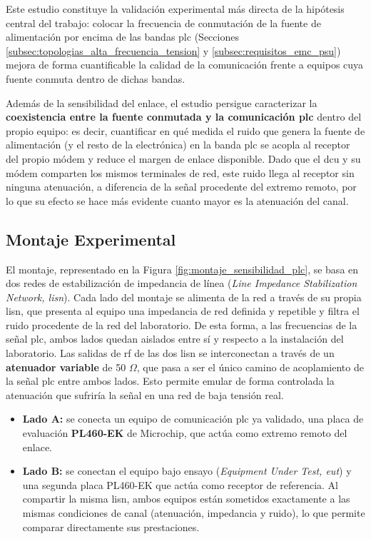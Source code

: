 Este estudio constituye la validación experimental más directa de la hipótesis central del trabajo: colocar la frecuencia de conmutación de la fuente de alimentación por encima de las bandas \gls{plc} (Secciones \ref{subsec:topologias_alta_frecuencia_tension} y \ref{subsec:requisitos_emc_psu}) mejora de forma cuantificable la calidad de la comunicación frente a equipos cuya fuente conmuta dentro de dichas bandas.

Además de la sensibilidad del enlace, el estudio persigue caracterizar la \textbf{coexistencia entre la fuente conmutada y la comunicación \gls{plc}} dentro del propio equipo: es decir, cuantificar en qué medida el ruido que genera la fuente de alimentación (y el resto de la electrónica) en la banda \gls{plc} se acopla al receptor del propio módem y reduce el margen de enlace disponible. Dado que el \gls{dcu} y su módem comparten los mismos terminales de red, este ruido llega al receptor sin ninguna atenuación, a diferencia de la señal procedente del extremo remoto, por lo que su efecto se hace más evidente cuanto mayor es la atenuación del canal.

\subsection{Montaje Experimental}
\label{subsec:montaje_sensibilidad}

El montaje, representado en la Figura \ref{fig:montaje_sensibilidad_plc}, se basa en dos redes de estabilización de impedancia de línea (\textit{Line Impedance Stabilization Network, \gls{lisn}}). Cada lado del montaje se alimenta de la red a través de su propia \gls{lisn}, que presenta al equipo una impedancia de red definida y repetible y filtra el ruido procedente de la red del laboratorio. De esta forma, a las frecuencias de la señal \gls{plc}, ambos lados quedan aislados entre sí y respecto a la instalación del laboratorio. Las salidas de \gls{rf} de las dos \gls{lisn} se interconectan a través de un \textbf{atenuador variable} de 50 $\Omega$, que pasa a ser el único camino de acoplamiento de la señal \gls{plc} entre ambos lados. Esto permite emular de forma controlada la atenuación que sufriría la señal en una red de baja tensión real.

\begin{itemize}
    \item \textbf{Lado A:} se conecta un equipo de comunicación \gls{plc} ya validado, una placa de evaluación \textbf{PL460-EK} de Microchip, que actúa como extremo remoto del enlace.
    \item \textbf{Lado B:} se conectan el equipo bajo ensayo (\textit{Equipment Under Test, \gls{eut}}) y una segunda placa PL460-EK que actúa como receptor de referencia. Al compartir la misma \gls{lisn}, ambos equipos están sometidos exactamente a las mismas condiciones de canal (atenuación, impedancia y ruido), lo que permite comparar directamente sus prestaciones.
\end{itemize}

